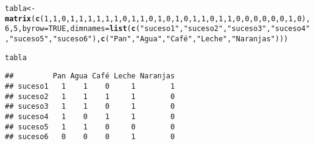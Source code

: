 \documentclass[12pt]{report}\usepackage[]{graphicx}\usepackage[dvipsnames]{xcolor}
\makeatletter
\newcommand{\hlnum}[1]{\textcolor[rgb]{0.686,0.059,0.569}{#1}}%
\newcommand{\hlstr}[1]{\textcolor[rgb]{0.192,0.494,0.8}{#1}}%
\newcommand{\hlstd}[1]{\textcolor[rgb]{0.345,0.345,0.345}{#1}}%
\newcommand{\hlkwb}[1]{\textcolor[rgb]{0.69,0.353,0.396}{#1}}%
\newcommand{\hlkwc}[1]{\textcolor[rgb]{0.333,0.667,0.333}{#1}}%
\newcommand{\hlkwd}[1]{\textcolor[rgb]{0.737,0.353,0.396}{\textbf{#1}}}%
\newenvironment{kframe}{%
 \def\at@end@of@kframe{}%
 \ifinner\ifhmode%
  \def\at@end@of@kframe{\end{minipage}}%
  \begin{minipage}{\columnwidth}%
 \fi\fi%
 \def\FrameCommand##1{\hskip\@totalleftmargin \hskip-\fboxsep
 \colorbox{shadecolor}{##1}\hskip-\fboxsep
     \hskip-\linewidth \hskip-\@totalleftmargin \hskip\columnwidth}%
 \MakeFramed {\advance\hsize-\width
   \@totalleftmargin\z@ \linewidth\hsize
   \@setminipage}}%
 {\par\unskip\endMakeFramed%
 \at@end@of@kframe}
\newenvironment{knitrout}{}{} %
\makeatother
\begin{document}
\begin{knitrout}
\color{fgcolor}\begin{kframe}
\begin{alltt}
\hlstd{tabla} \hlkwb{<-} \hlkwd{matrix}\hlstd{(}\hlkwd{c}\hlstd{(}\hlnum{1}\hlstd{,}\hlnum{1}\hlstd{,}\hlnum{0}\hlstd{,}\hlnum{1}\hlstd{,}\hlnum{1}\hlstd{,} \hlnum{1}\hlstd{,}\hlnum{1}\hlstd{,}\hlnum{1}\hlstd{,}\hlnum{1}\hlstd{,}\hlnum{0}\hlstd{,} \hlnum{1}\hlstd{,}\hlnum{1}\hlstd{,}\hlnum{0}\hlstd{,}\hlnum{1}\hlstd{,}\hlnum{0}\hlstd{,} \hlnum{1}\hlstd{,}\hlnum{0}\hlstd{,}\hlnum{1}\hlstd{,}\hlnum{1}\hlstd{,}\hlnum{0}\hlstd{,} \hlnum{1}\hlstd{,}\hlnum{1}\hlstd{,}\hlnum{0}\hlstd{,}\hlnum{0}\hlstd{,}\hlnum{0}\hlstd{,} \hlnum{0}\hlstd{,}\hlnum{0}\hlstd{,}\hlnum{0}\hlstd{,}\hlnum{1}\hlstd{,}\hlnum{0}\hlstd{),}\hlnum{6}\hlstd{,}\hlnum{5}\hlstd{,}\hlkwc{byrow}\hlstd{=}\hlnum{TRUE}\hlstd{,}\hlkwc{dimnames}\hlstd{=}\hlkwd{list}\hlstd{(}\hlkwd{c}\hlstd{(}\hlstr{"suceso1"}\hlstd{,}\hlstr{"suceso2"}\hlstd{,}\hlstr{"suceso3"}\hlstd{,}\hlstr{"suceso4"}\hlstd{,}\hlstr{"suceso5"}\hlstd{,}\hlstr{"suceso6"}\hlstd{),}\hlkwd{c}\hlstd{(}\hlstr{"Pan"}\hlstd{,}\hlstr{"Agua"}\hlstd{,}\hlstr{"Café"}\hlstd{,}\hlstr{"Leche"}\hlstd{,}\hlstr{"Naranjas"}\hlstd{)))}

\hlstd{tabla}
\end{alltt}
\begin{verbatim}
##         Pan Agua Café Leche Naranjas
## suceso1   1    1    0     1        1
## suceso2   1    1    1     1        0
## suceso3   1    1    0     1        0
## suceso4   1    0    1     1        0
## suceso5   1    1    0     0        0
## suceso6   0    0    0     1        0
\end{verbatim}
\end{kframe}
\end{knitrout}
\end{document}
